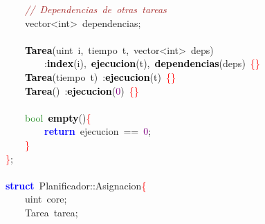 \mbox{}\ \ \ \ \textit{\textcolor{Brown}{//\ Dependencias\ de\ otras\ tareas}} \\
\mbox{}\ \ \ \ \textcolor{TealBlue}{vector\textless{}int\textgreater{}}\ dependencias\textcolor{BrickRed}{;} \\
\mbox{} \\
\mbox{}\ \ \ \ \textbf{\textcolor{Black}{Tarea}}\textcolor{BrickRed}{(}\textcolor{TealBlue}{uint}\ i\textcolor{BrickRed}{,}\ \textcolor{TealBlue}{tiempo}\ t\textcolor{BrickRed}{,}\ \textcolor{TealBlue}{vector\textless{}int\textgreater{}}\ deps\textcolor{BrickRed}{)} \\
\mbox{}\ \ \ \ \ \ \ \ \textcolor{BrickRed}{:}\textbf{\textcolor{Black}{index}}\textcolor{BrickRed}{(}i\textcolor{BrickRed}{),}\ \textbf{\textcolor{Black}{ejecucion}}\textcolor{BrickRed}{(}t\textcolor{BrickRed}{),}\ \textbf{\textcolor{Black}{dependencias}}\textcolor{BrickRed}{(}deps\textcolor{BrickRed}{)}\ \textcolor{Red}{\{\}} \\
\mbox{}\ \ \ \ \textbf{\textcolor{Black}{Tarea}}\textcolor{BrickRed}{(}\textcolor{TealBlue}{tiempo}\ t\textcolor{BrickRed}{)}\ \textcolor{BrickRed}{:}\textbf{\textcolor{Black}{ejecucion}}\textcolor{BrickRed}{(}t\textcolor{BrickRed}{)}\ \textcolor{Red}{\{\}} \\
\mbox{}\ \ \ \ \textbf{\textcolor{Black}{Tarea}}\textcolor{BrickRed}{()}\ \textcolor{BrickRed}{:}\textbf{\textcolor{Black}{ejecucion}}\textcolor{BrickRed}{(}\textcolor{Purple}{0}\textcolor{BrickRed}{)}\ \textcolor{Red}{\{\}} \\
\mbox{} \\
\mbox{}\ \ \ \ \textcolor{ForestGreen}{bool}\ \textbf{\textcolor{Black}{empty}}\textcolor{BrickRed}{()}\textcolor{Red}{\{} \\
\mbox{}\ \ \ \ \ \ \ \ \textbf{\textcolor{Blue}{return}}\ ejecucion\ \textcolor{BrickRed}{==}\ \textcolor{Purple}{0}\textcolor{BrickRed}{;} \\
\mbox{}\ \ \ \ \textcolor{Red}{\}} \\
\mbox{}\textcolor{Red}{\}}\textcolor{BrickRed}{;} \\
\mbox{} \\
\mbox{}\textbf{\textcolor{Blue}{struct}}\ \textcolor{TealBlue}{Planificador}\textcolor{BrickRed}{::}Asignacion\textcolor{Red}{\{} \\
\mbox{}\ \ \ \ \textcolor{TealBlue}{uint}\ core\textcolor{BrickRed}{;} \\
\mbox{}\ \ \ \ \textcolor{TealBlue}{Tarea}\ tarea\textcolor{BrickRed}{;} \\
